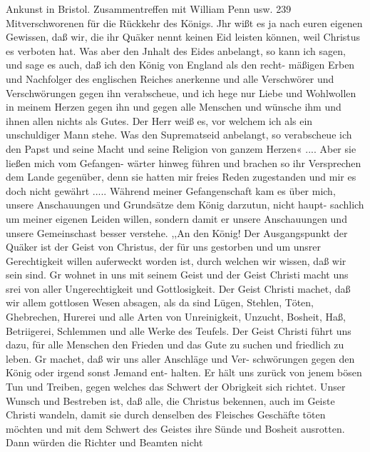 Ankunst in Bristol. Zusammentreffen mit William Penn usw. 239
Mitverschworenen für die Rückkehr des Königs. Jhr wißt es ja
nach euren eigenen Gewissen, daß wir, die ihr Quäker nennt
keinen Eid leisten können, weil Christus es verboten hat. Was
aber den Jnhalt des Eides anbelangt, so kann ich sagen, und
sage es auch, daß ich den König von England als den recht-
mäßigen Erben und Nachfolger des englischen Reiches anerkenne
und alle Verschwörer und Verschwörungen gegen ihn verabscheue,
und ich hege nur Liebe und Wohlwollen in meinem Herzen gegen
ihn und gegen alle Menschen und wünsche ihm und ihnen allen
nichts als Gutes. Der Herr weiß es, vor welchem ich als ein
unschuldiger Mann stehe. Was den Suprematseid anbelangt, so
verabscheue ich den Papst und seine Macht und seine Religion
von ganzem Herzen« .... Aber sie ließen mich vom Gefangen-
wärter hinweg führen und brachen so ihr Versprechen dem Lande
gegenüber, denn sie hatten mir freies Reden zugestanden und mir
es doch nicht gewährt .....
Während meiner Gefangenschaft kam es über mich, unsere
Anschauungen und Grundsätze dem König darzutun, nicht haupt-
sachlich um meiner eigenen Leiden willen, sondern damit er unsere
Anschauungen und unsere Gemeinschast besser verstehe.
,,An den König!
Der Ausgangspunkt der Quäker ist der Geist von Christus,
der für uns gestorben und um unsrer Gerechtigkeit willen auferweckt
worden ist, durch welchen wir wissen, daß wir sein sind. Gr
wohnet in uns mit seinem Geist und der Geist Christi macht uns
srei von aller Ungerechtigkeit und Gottlosigkeit. Der Geist Christi
machet, daß wir allem gottlosen Wesen absagen, als da sind
Lügen, Stehlen, Töten, Ghebrechen, Hurerei und alle Arten von
Unreinigkeit, Unzucht, Bosheit, Haß, Betriigerei, Schlemmen und
alle Werke des Teufels. Der Geist Christi führt uns dazu, für
alle Menschen den Frieden und das Gute zu suchen und friedlich
zu leben. Gr machet, daß wir uns aller Anschläge und Ver-
schwörungen gegen den König oder irgend sonst Jemand ent-
halten. Er hält uns zurück von jenem bösen Tun und Treiben,
gegen welches das Schwert der Obrigkeit sich richtet. Unser Wunsch
und Bestreben ist, daß alle, die Christus bekennen, auch im Geiste
Christi wandeln, damit sie durch denselben des Fleisches Geschäfte
töten möchten und mit dem Schwert des Geistes ihre Sünde und
Bosheit ausrotten. Dann würden die Richter und Beamten nicht

